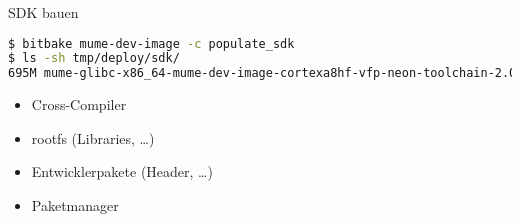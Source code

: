 \begin{frame}[fragile]{SDK bauen}
	\pause
	\begin{lstlisting}[frame=single,language=bash, breaklines=true, basicstyle=\small\ttfamily]
$ bitbake mume-dev-image -c populate_sdk
$ ls -sh tmp/deploy/sdk/
695M mume-glibc-x86_64-mume-dev-image-cortexa8hf-vfp-neon-toolchain-2.0.sh
	\end{lstlisting}
	\pause
	\begin{itemize}
		\item Cross-Compiler
		\item rootfs (Libraries, \ldots)
		\item Entwicklerpakete (Header, \ldots)
		\item Paketmanager
	\end{itemize}
\end{frame}
